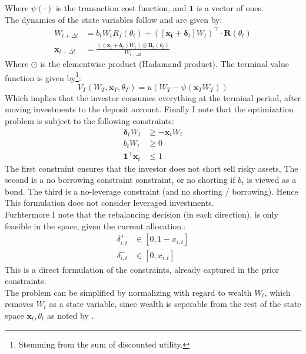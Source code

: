 \documentclass[11pt]{article}
\begin{document}
Where $\psi(\cdot )$ is the transaction cost function, and $\mathbf{1}$ is a vector of ones.\\
The dynamics of the state variables follow \textcite{Schober2022} and are given by:
\begin{align}
  W_{t+\Delta t} &= b_t W_t R_f (\theta_t) +  ( [ \mathbf{x_t} + \boldsymbol{\delta}_t ] W_t )^{\top} \cdot \mathbf{R}(\theta_t) \\
  \mathbf{x}_{t+\Delta t} &=  \frac{( (\mathbf{x}_t + \boldsymbol{\delta}_t ) W_t ) \odot \mathbf{R}_t (\theta_t )}{ W_{t+\Delta t} }
\end{align}
Where $\odot$ is the elementwise product (Hadamand product). The terminal value function is
given by\footnote{Stemming from the sum of discounted utility.}:
\begin{equation} \label{eq: class_terminal_value_non_normalized}
  V_T (W_T , \mathbf{x}_T , \theta_T ) = u ( W_T - \psi ( \mathbf{x}_T W_T ))
\end{equation}
Which implies that the investor consumes everything at the terminal period, after moving investments to the deposit account.
Finally I note that the optimization problem is subject to the following constraints:
\begin{align}
  \boldsymbol{\delta}_t W_t &\geq - \mathbf{x}_t W_t \\
  b_t W_t &\geq 0 \\
  \mathbf{1}^{\top} \mathbf{x}_t &\leq 1
\end{align}
The first constraint ensures that the investor does not short sell risky assets, 
The second is a no borrowing constraint constraint, or no shorting if $b_t$ is viewed as a bond.
The third is a no-leverage constraint (and no shorting / borrowing).
Hence This formulation does not consider leveraged investments.\\
Furhtermore I note that the rebalancing decision (in each direction), is only feasible in the space, given the current allocation.:
\begin{align}
  \delta^{+}_{i,t} &\in [0 , 1-x_{i,t}]  \label{eq: delta+_space} \\
  \delta^{-}_{i,t} &\in [0 , x_{i,t}] \label{eq: delta-_space}
\end{align}
This is a direct formulation of the constraints, already captured in the prior constraints.\\
The problem can be simplified by normalizing with regard to wealth $W_t$, which removes $W_t$ as a state variable, since
wealth is seperable from the rest of the state space $\mathbf{x}_t , \theta_t$ as noted by \textcite{CaiJuddXu2013}.\\
\end{document}
